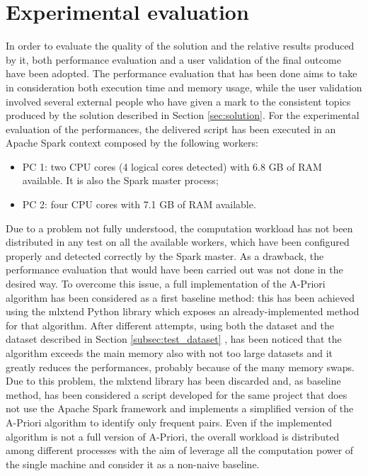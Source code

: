\section{Experimental evaluation}
\label{sec:experimental_evaluation}
In order to evaluate the quality of the solution and the relative results produced by it, both performance evaluation and a user validation of the final outcome have been adopted. The performance evaluation that has been done aims to take in consideration both execution time and memory usage, while the user validation involved several external people who have given a mark to the consistent topics produced by the solution described in Section \ref{sec:solution}.
For the experimental evaluation of the performances, the delivered script has been executed in an Apache Spark context composed by the following workers:
\begin{itemize}
	\item PC 1: two CPU cores (4 logical cores detected) with 6.8 GB of RAM available. It is also the Spark master process;
	\item PC 2: four CPU cores with 7.1 GB of RAM available.
\end{itemize}
Due to a problem not fully understood, the computation workload has not been distributed in any test on all the available workers, which have been configured properly and detected correctly by the Spark master. As a drawback, the performance evaluation that would have been carried out was not done in the desired way. To overcome this issue, a full implementation of the A-Priori algorithm has been considered as a first baseline method: this has been achieved using the mlxtend Python library \cite{mlxtend-reference} which exposes an already-implemented method for that algorithm. After different attempts, using both the dataset \cite{covid19-tweets-dataset} and the dataset described in Section \ref{subsec:test_dataset} \cite{sentiment-analysis-dataset}, has been noticed that the algorithm exceeds the main memory also with not too large datasets and it greatly reduces the performances, probably because of the many memory swaps. Due to this problem, the mlxtend library has been discarded and, as baseline method, has been considered a script developed for the same project that does not use the Apache Spark framework and implements a simplified version of the A-Priori algorithm to identify only frequent pairs. Even if the implemented algorithm is not a full version of A-Priori, the overall workload is distributed among different processes with the aim of leverage all the computation power of the single machine and consider it as a non-naive baseline. 

